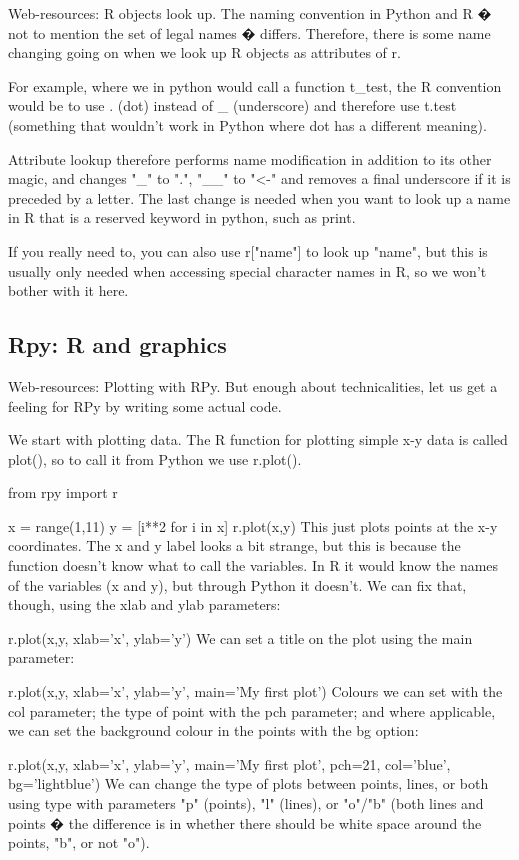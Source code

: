 Web-resources:
R objects look up.
The naming convention in Python and R � not to mention the set of legal names � differs. Therefore, there is some name changing going on when we look up R objects as attributes of r.

For example, where we in python would call a function t_test, the R convention would be to use . (dot) instead of _ (underscore) and therefore use t.test (something that wouldn't work in Python where dot has a different meaning).

Attribute lookup therefore performs name modification in addition to its other magic, and changes "_" to ".", "__" to "<-" and removes a final underscore if it is preceded by a letter. The last change is needed when you want to look up a name in R that is a reserved keyword in python, such as print.

If you really need to, you can also use r["name"] to look up "name", but this is usually only needed when accessing special character names in R, so we won't bother with it here.

\subsection{Rpy: R and graphics}

Web-resources:
Plotting with RPy.
But enough about technicalities, let us get a feeling for RPy by writing some actual code.

We start with plotting data. The R function for plotting simple x-y data is called plot(), so to call it from Python we use r.plot().

from rpy import r

x = range(1,11)
y = [i**2 for i in x]
r.plot(x,y)
This just plots points at the x-y coordinates. The x and y label looks a bit strange, but this is because the function doesn't know what to call the variables. In R it would know the names of the variables (x and y), but through Python it doesn't. We can fix that, though, using the xlab and ylab parameters:

r.plot(x,y, xlab='x', ylab='y')
We can set a title on the plot using the main parameter:

r.plot(x,y, xlab='x', ylab='y', main='My first plot')
Colours we can set with the col parameter; the type of point with the pch parameter; and where applicable, we can set the background colour in the points with the bg option:

r.plot(x,y, xlab='x', ylab='y', main='My first plot',
       pch=21, col='blue', bg='lightblue')
We can change the type of plots between points, lines, or both using type with parameters "p" (points), "l" (lines), or "o"/"b" (both lines and points � the difference is in whether there should be white space around the points, "b", or not "o").

